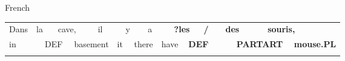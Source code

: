 \begin{listWWNumileveli}
\item {}

\begin{styleExample}
\label{bkm:Ref172696738}French

\end{styleExample}

\end{listWWNumileveli}

\begin{tabular}{llllllllllllllllllll}
\lsptoprule
Dans & \multicolumn{2}{l}{la

} & \multicolumn{2}{l}{cave,

} & \multicolumn{2}{l}{il

} & \multicolumn{2}{l}{y

} & \multicolumn{2}{l}{a

} & \multicolumn{2}{l}{{\bfseries ?les}

} & \multicolumn{2}{l}{{\bfseries /}

} & \multicolumn{2}{l}{{\bfseries des}

} & \multicolumn{2}{l}{{\bfseries souris,}

} & \\
\multicolumn{2}{l}{in

} & \multicolumn{2}{l}{DEF

} & \multicolumn{2}{l}{basement

} & \multicolumn{2}{l}{it

} & \multicolumn{2}{l}{there

} & \multicolumn{2}{l}{have

} & \multicolumn{2}{l}{{\bfseries DEF}

} & \multicolumn{2}{l}{} & \multicolumn{2}{l}{{\bfseries PARTART}

} & \multicolumn{2}{l}{{\bfseries mouse.PL}

}\\
\lspbottomrule
\end{tabular}

